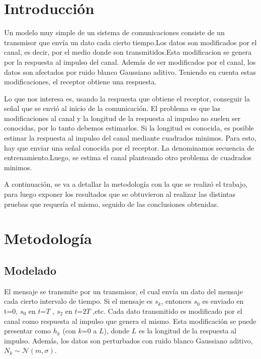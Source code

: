 \documentclass{article}
\begin{document}
\begin{multicols}{2}

\section{Introducción}


\par Un modelo muy simple de un sistema de comunicaciones consiste de un transmisor que envía un dato cada cierto tiempo.Los datos son modificados por el canal, es decir, por el medio donde son transmitidos.Esta modificacion se genera por la respuesta al impulso del
canal. Además de ser modificados por el canal, los datos son afectados por ruido blanco Gaussiano aditivo. Teniendo en cuenta estas modificaciones, el receptor obtiene una respuesta.
\par Lo que nos interesa es, usando la respuesta que obtiene el receptor, conseguir la señal que se envió al inicio de la comunicación. El problema es que las modificaciones al canal y la longitud de la respuesta al impulso no suelen ser conocidas, por lo tanto debemos estimarlos. 
Si la longitud es conocida, es posible estimar la respuesta al impulso del canal mediante cuadrados minimos. Para esto, hay que enviar una señal conocida por el receptor. La denominamos secuencia de entrenamiento.Luego, se estima el canal planteando otro problema de cuadrados minimos. 
\par A continuación, se va a detallar la metodología con la que se realizó el trabajo, para luego exponer los resultados que se obtuvieron al realizar las distintas pruebas que requería el mismo, seguido de las conclusiones obtenidas.

\section{Metodología}
\subsection{Modelado}
\label{sec1}

\par El mensaje se transmite por un transmisor, el cual envía un dato del mensaje cada cierto intervalo de tiempo. Si el mensaje es $s_{k}$, entonces $s_{0}$ es enviado en t=0, $s_{0}$ en $t$=$T$ , $s_{2}$ en $t$=$2T$ ,etc. Cada dato transmitido es modificado por el canal como respuesta al impulso que genera el mismo. Esta modificación se puede presentar como $h_{k}$ (con $k$=$0$ a $L$), donde $L$ es la longitud de la respuesta al impulso. Además, los datos son perturbados con ruido blanco Gaussiano aditivo, $N_{k} \sim \mathcal{N} (m,\sigma)$.


\end{multicols}
\end{document}
